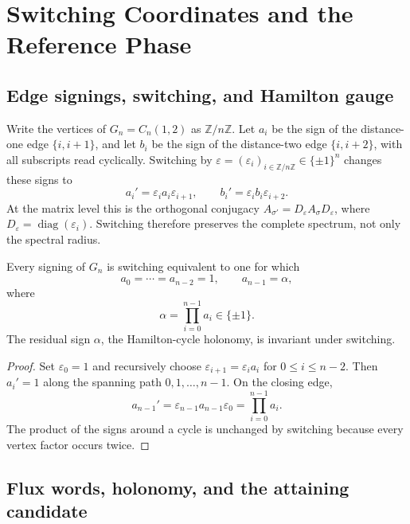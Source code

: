 \section{Switching Coordinates and the Reference Phase}
\label{sec:switching-reference}

\subsection{Edge signings, switching, and Hamilton gauge}
\label{subsec:edge-signings-switching-hamilton-gauge}

Write the vertices of \(G_n=C_n(1,2)\) as \(\mathbb Z/n\mathbb Z\).  Let
\(a_i\) be the sign of the distance-one edge \(\{i,i+1\}\), and let \(b_i\)
be the sign of the distance-two edge \(\{i,i+2\}\), with all subscripts
read cyclically.  Switching by
\(\varepsilon=(\varepsilon_i)_{i\in\mathbb Z/n\mathbb Z}\in\{\pm1\}^n\)
changes these signs to
\[
a_i'=\varepsilon_i a_i\varepsilon_{i+1},
\qquad
b_i'=\varepsilon_i b_i\varepsilon_{i+2}.
\]
At the matrix level this is the orthogonal conjugacy
\(A_{\sigma'}=D_\varepsilon A_\sigma D_\varepsilon\), where
\(D_\varepsilon=\operatorname{diag}(\varepsilon_i)\).  Switching therefore
preserves the complete spectrum, not only the spectral radius.

\begin{lemma}\label{lem:hamilton-gauge}
Every signing of \(G_n\) is switching equivalent to one for which
\[
a_0=\cdots=a_{n-2}=1,\qquad a_{n-1}=\alpha,
\]
where
\[
\alpha=\prod_{i=0}^{n-1}a_i\in\{\pm1\}.
\]
The residual sign \(\alpha\), the Hamilton-cycle holonomy, is invariant
under switching.
\end{lemma}

\begin{proof}
Set \(\varepsilon_0=1\) and recursively choose
\(\varepsilon_{i+1}=\varepsilon_i a_i\) for \(0\leq i\leq n-2\).
Then \(a_i'=1\) along the spanning path \(0,1,\ldots,n-1\).  On the closing
edge,
\[
a_{n-1}'=\varepsilon_{n-1}a_{n-1}\varepsilon_0
=\prod_{i=0}^{n-1}a_i.
\]
The product of the signs around a cycle is unchanged by switching because
every vertex factor occurs twice.
\end{proof}

\subsection{Flux words, holonomy, and the attaining candidate}
\label{subsec:flux-words-holonomy-attaining-candidate}


